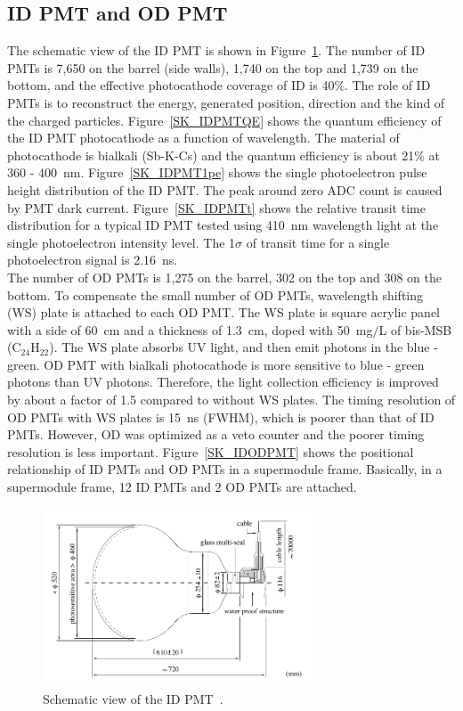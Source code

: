 \subsection{ID PMT and OD PMT}
\vs\hs
The schematic view of the ID PMT is shown in Figure~\ref{SK_IDPMT}.
The number of ID PMTs is 7,650 on the barrel (side walls), 1,740 on the top and 1,739 on the bottom, and the effective photocathode coverage of ID is 40\%.
The role of ID PMTs is to reconstruct the energy, generated position, direction and the kind of the charged particles.
Figure~\ref{SK_IDPMTQE} shows the quantum efficiency of the ID PMT photocathode as a function of wavelength.
The material of photocathode is bialkali (Sb-K-Cs) and the quantum efficiency is about 21\% at 360 - 400~nm.
Figure~\ref{SK_IDPMT1pe} shows the single photoelectron pulse height distribution of the ID PMT.
The peak around zero ADC count is caused by PMT dark current.
Figure~\ref{SK_IDPMTt} shows the relative transit time distribution for a typical ID PMT tested using 410~nm wavelength light at the single photoelectron intensity level.
The 1$\sigma$ of transit time for a single photoelectron signal is 2.16~ns.\\
\hs The number of OD PMTs is 1,275 on the barrel, 302 on the top and 308 on the bottom.
To compensate the small number of OD PMTs, wavelength shifting (WS) plate is attached to each OD PMT.
The WS plate is square acrylic panel with a side of 60~cm and a thickness of 1.3~cm, doped with 50~mg$/$L of bis-MSB (C$_{\text{24}}$H$_{\text{22}}$).
The WS plate absorbs UV light, and then emit photons in the blue - green.
OD PMT with bialkali photocathode is more sensitive to blue - green photons than UV photons.
Therefore, the light collection efficiency is improved by about a factor of 1.5 compared to without WS plates.
The timing resolution of OD PMTs with WS plates is 15~ns (FWHM), which is poorer than that of ID PMTs.
However, OD was optimized as a veto counter and the poorer timing resolution is less important.
Figure~\ref{SK_IDODPMT} shows the positional relationship of ID PMTs and OD PMTs in a supermodule frame.
Basically, in a supermodule frame, 12 ID PMTs and 2 OD PMTs are attached.

\begin{figure}[H]
	\centering
	\includegraphics[width=8cm]{Figures/SK/IDPMT}
	\caption[Schematic view of the ID PMT]{
	Schematic view of the ID PMT~\cite{2003Fukuda}.
	}\label{SK_IDPMT}
\end{figure}

